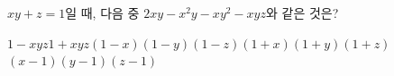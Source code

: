$xy+z=1$일 때, 다음 중 $2xy-x^2y-xy^2-xyz$와 같은 것은?
\begin{choicesii}{$1-xyz$}{$1+xyz$}{$(1-x)(1-y)(1-z)$}{$(1+x)(1+y)(1+z)$}{$(x-1)(y-1)(z-1)$}\end{choicesii}
